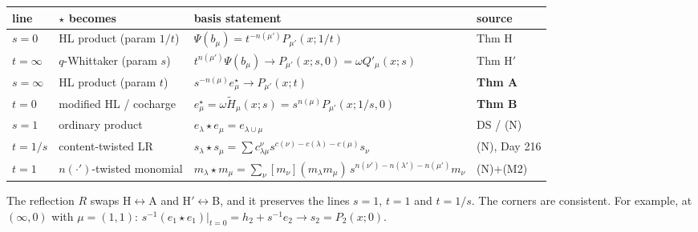 \documentclass[11pt]{article}
\theoremstyle{definition}
\newcommand{\Ht}{\widetilde{H}}
\begin{document}
\begin{center}
\small
\begin{tabularx}{\textwidth}{@{}l Y Y l@{}}
\toprule
line & $\star$ becomes & basis statement & source\\
\midrule
$s=0$ & HL product (param $1/t$) & $\Psi(b_\mu)=t^{-n(\mu')}P_{\mu'}(x;1/t)$ & Thm H\\
$t=\infty$ & $q$-Whittaker (param $s$) & $t^{n(\mu')}\Psi(b_\mu)\to P_{\mu'}(x;s,0)=\omega Q'_\mu(x;s)$ & Thm H$'$\\
$s=\infty$ & HL product (param $t$) & $s^{-n(\mu)}e^\star_\mu\to P_{\mu'}(x;t)$ & \textbf{Thm A}\\
$t=0$ & modified HL / cocharge & $e^\star_\mu=\omega\Ht_\mu(x;s)=s^{n(\mu)}P_{\mu'}(x;1/s,0)$ & \textbf{Thm B}\\
$s=1$ & ordinary product & $e_\lambda\star e_\mu=e_{\lambda\cup\mu}$ & DS / (N)\\
$t=1/s$ & content-twisted LR & $s_\lambda\star s_\mu=\sum c^\nu_{\lambda\mu}s^{c(\nu)-c(\lambda)-c(\mu)}s_\nu$ & (N), Day 216\\
$t=1$ & $n(\cdot')$-twisted monomial & $m_\lambda\star m_\mu=\sum_\nu[m_\nu](m_\lambda m_\mu)\,s^{n(\nu')-n(\lambda')-n(\mu')}m_\nu$ & (N)+(M2)\\
\bottomrule
\end{tabularx}
\end{center}
The reflection $R$ swaps H$\leftrightarrow$A and H$'\leftrightarrow$B, and it preserves the lines $s=1$, $t=1$ and $t=1/s$. The corners are consistent. For example, at $(\infty,0)$ with $\mu=(1,1)$: $s^{-1}(e_1\star e_1)|_{t=0}=h_2+s^{-1}e_2\to s_2=P_2(x;0)$.
\end{document}
